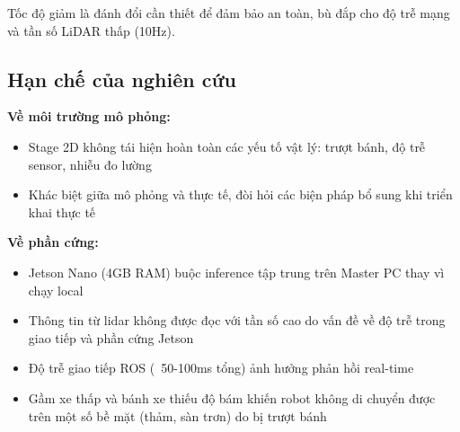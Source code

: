 Tốc độ giảm là đánh đổi cần thiết để đảm bảo an toàn, bù đắp cho độ trễ mạng và tần số LiDAR thấp (10Hz).

\subsection{Hạn chế của nghiên cứu}

\textbf{Về môi trường mô phỏng:}
\begin{itemize}[nosep]
\item Stage 2D không tái hiện hoàn toàn các yếu tố vật lý: trượt bánh, độ trễ sensor, nhiễu đo lường
\item Khác biệt giữa mô phỏng và thực tế, đòi hỏi các biện pháp bổ sung khi triển khai thực tế
\end{itemize}

\textbf{Về phần cứng:}
\begin{itemize}[nosep]
\item Jetson Nano (4GB RAM) buộc inference tập trung trên Master PC thay vì chạy local
\item Thông tin từ lidar không được đọc với tần số cao do vấn đề về độ trễ trong giao tiếp và phần cứng Jetson
\item Độ trễ giao tiếp ROS (~50-100ms tổng) ảnh hưởng phản hồi  real-time
\item Gầm xe thấp và bánh xe thiếu độ bám khiến robot không di chuyển được trên một số bề mặt (thảm, sàn trơn) do bị trượt bánh
\end{itemize}

